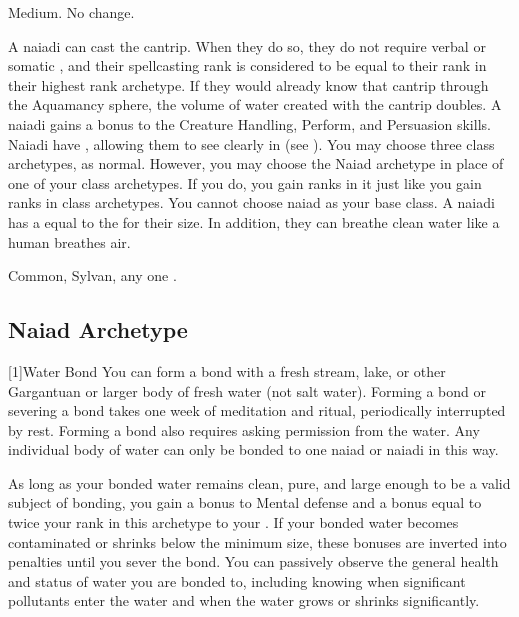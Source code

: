      Medium.
     No change.
    \begin{itemize}
         A naiadi can cast the  cantrip.
            When they do so, they do not require verbal or somatic , and their spellcasting rank is considered to be equal to their rank in their highest rank archetype.
            If they would already know that cantrip through the Aquamancy sphere, the volume of water created with the cantrip doubles.
         A naiadi gains a  bonus to the Creature Handling, Perform, and Persuasion skills.
         Naiadi have , allowing them to see clearly in  (see ).
         You may choose three class archetypes, as normal.
            However, you may choose the Naiad archetype in place of one of your class archetypes.
            If you do, you gain ranks in it just like you gain ranks in class archetypes.
            You cannot choose naiad as your base class.
         A naiadi has a  equal to the  for their size.
            In addition, they can breathe clean water like a human breathes air.
    \end{itemize}
     Common, Sylvan, any one .

    \subsection{Naiad Archetype}

        [1]{Water Bond} You can form a bond with a fresh stream, lake, or other Gargantuan or larger body of fresh water (not salt water).
        Forming a bond or severing a bond takes one week of meditation and ritual, periodically interrupted by rest.
        Forming a bond also requires asking permission from the water.
        Any individual body of water can only be bonded to one naiad or naiadi in this way.

        As long as your bonded water remains clean, pure, and large enough to be a valid subject of bonding, you gain a  bonus to Mental defense and a bonus equal to twice your rank in this archetype to your .
        If your bonded water becomes contaminated or shrinks below the minimum size, these bonuses are inverted into penalties until you sever the bond.
        You can passively observe the general health and status of water you are bonded to, including knowing when significant pollutants enter the water and when the water grows or shrinks significantly.

